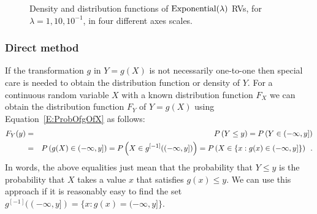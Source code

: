 
\begin{figure}[htpb]
\caption{Density and distribution functions of $\mbox{{\rm Exponential}}(\lambda)$ RVs, for $\lambda=1, 10, 10^{-1}$, in four different axes scales.\label{F:plotPdfCdfExponentials}}
\centering   {}
\end{figure}


\subsubsection{Direct method}\label{S:DirectMethod}
If the transformation $g$ in $Y=g(X)$ is not necessarily one-to-one then special care is needed to obtain the distribution function or density of $Y$.  
For a continuous random variable $X$ with a known distribution function $F_X$ we can obtain the distribution function $F_Y$ of $Y=g(X)$ using Equation~\eqref{E:ProbOfgOfX} as follows:
\begin{eqnarray}\label{Eqn:DirectMethod}
F_Y(y)
&=& P \left(Y \leq y \right) = P \left(Y \in (-\infty, y] \right) \notag \\
&=& P \left( g(X) \in (-\infty, y] \right) = P \left( X \in g^{[-1]}((-\infty, y]) \right) = P \left(X \in \{x: g(x) \in (-\infty,y]\}  \right) \enspace . 
\end{eqnarray}
In words, the above equalities just mean that the probability that $Y \leq y$ is the probability that $X$ takes a value $x$ that satisfies $g(x) \leq y$.  
We can use this approach if it is reasonably easy to find the set $g^{[-1]}((-\infty,y]) = \{x: g(x) = (-\infty,y]\}$.%

